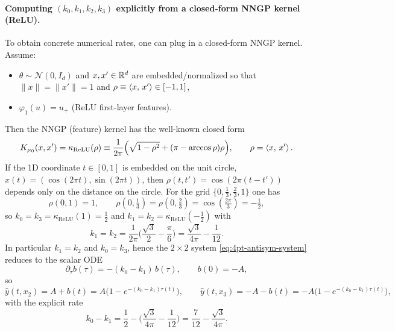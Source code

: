 \paragraph{Computing $(k_0,k_1,k_2,k_3)$ explicitly from a closed-form NNGP kernel (ReLU).}
To obtain concrete numerical rates, one can plug in a closed-form NNGP kernel.
Assume:
\begin{itemize}
\item $\theta\sim \mathcal{N}(0,I_d)$ and $x,x'\in\mathbb{R}^d$ are embedded/normalized so that $\|x\|=\|x'\|=1$ and $\rho\equiv \left\langle x,\,x' \right\rangle\in[-1,1]$,
\item $\varphi_1(u)=u_+$ (ReLU first-layer features).
\end{itemize}
Then the NNGP (feature) kernel has the well-known closed form
\begin{equation}\label{eq:nngp-relu}
K_{\mu_0}(x,x')=\kappa_{\mathrm{ReLU}}(\rho)
\equiv \frac{1}{2\pi}\Big(\sqrt{1-\rho^2}+(\pi-\arccos\rho)\rho\Big),
\qquad \rho=\left\langle x,\,x' \right\rangle.
\end{equation}
If the 1D coordinate $t\in[0,1]$ is embedded on the unit circle, $x(t)=(\cos(2\pi t),\sin(2\pi t))$, then $\rho(t,t')=\cos(2\pi(t-t'))$ depends only on the distance on the circle.
For the grid $\{0,\tfrac13,\tfrac23,1\}$ one has
\[
\rho(0,1)=1,\qquad \rho\!\left(0,\tfrac13\right)=\rho\!\left(0,\tfrac23\right)=\cos\!\left(\tfrac{2\pi}{3}\right)=-\tfrac12,
\]
so $k_0=k_3=\kappa_{\mathrm{ReLU}}(1)=\tfrac12$ and $k_1=k_2=\kappa_{\mathrm{ReLU}}(-\tfrac12)$ with
\begin{equation}\label{eq:nngp-relu-minus-half}
k_1=k_2=\frac{1}{2\pi}\Big(\frac{\sqrt{3}}{2}-\frac{\pi}{6}\Big)=\frac{\sqrt{3}}{4\pi}-\frac{1}{12}.
\end{equation}
In particular $k_1=k_2$ and $k_0=k_3$, hence the $2\times 2$ system \eqref{eq:4pt-antisym-system} reduces to the scalar ODE
\[
\partial_\tau b(\tau)=-(k_0-k_1)\,b(\tau),\qquad b(0)=-A,
\]
so
\begin{equation}\label{eq:4pt-relu-explicit}
\hat y(t,x_2)=A+b(t)=A\Big(1-e^{-(k_0-k_1)\tau(t)}\Big),\qquad
\hat y(t,x_3)=-A-b(t)=-A\Big(1-e^{-(k_0-k_1)\tau(t)}\Big),
\end{equation}
with the explicit rate
\[
k_0-k_1=\frac{1}{2}-\Big(\frac{\sqrt{3}}{4\pi}-\frac{1}{12}\Big)=\frac{7}{12}-\frac{\sqrt{3}}{4\pi}.
\]

